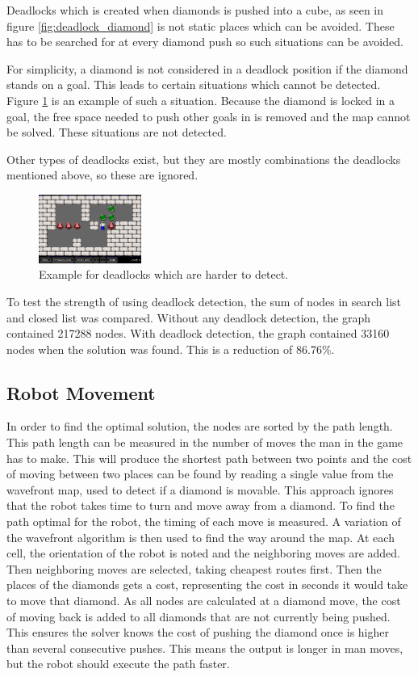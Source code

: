 Deadlocks which is created when diamonds is pushed into a cube, as seen in figure \ref{fig:deadlock_diamond} is not static places which can be avoided.
These has to be searched for at every diamond push so such situations can be avoided.

For simplicity, a diamond is not considered in a deadlock position if the diamond stands on a goal.
This leads to certain situations which cannot be detected.
Figure \ref{fig:deadlock_hard} is an example of such a situation.
Because the diamond is locked in a goal, the free space needed to push other goals in is removed and the map cannot be solved.
These situations are not detected.

Other types of deadlocks exist, but they are mostly combinations the deadlocks mentioned above, so these are ignored.

\begin{figure}[h]
  \centering
  \includegraphics[width=0.3\textwidth]{img/deadlock_hard}
  \caption{Example for deadlocks which are harder to detect.}
  \label{fig:deadlock_hard}
\end{figure}

To test the strength of using deadlock detection, the sum of nodes in search list and closed list was compared.
Without any deadlock detection, the graph contained 217288 nodes.
With deadlock detection, the graph contained 33160 nodes when the solution was found.
This is a reduction of 86.76\%. 

\subsection{Robot Movement}
In order to find the optimal solution, the nodes are sorted by the path length.
This path length can be measured in the number of moves the man in the game has to make.
This will produce the shortest path between two points and the cost of moving between two places can be found by reading a single value from the wavefront map, used to detect if a diamond is movable.
This approach ignores that the robot takes time to turn and move away from a diamond.
To find the path optimal for the robot, the timing of each move is measured.
A variation of the wavefront algorithm is then used to find the way around the map.
At each cell, the orientation of the robot is noted and the neighboring moves are added.
Then neighboring moves are selected, taking cheapest routes first.
Then the places of the diamonds gets a cost, representing the cost in seconds it would take to move that diamond.
As all nodes are calculated at a diamond move, the cost of moving back is added to all diamonds that are not currently being pushed.
This ensures the solver knows the cost of pushing the diamond once is higher than several consecutive pushes. 
This means the output is longer in man moves, but the robot should execute the path faster.

